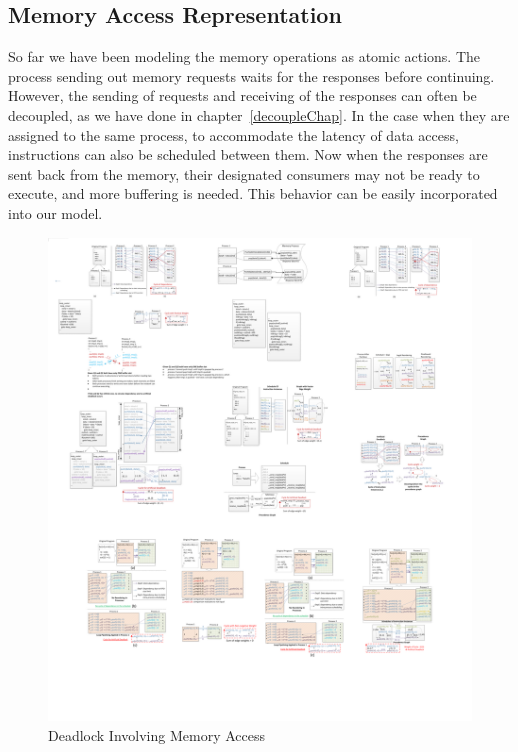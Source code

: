 \subsection{Memory Access Representation}
\label{memstrange}
So far we have been modeling the memory operations as atomic actions.
The process sending out memory requests
waits for the responses before continuing. 
However, the sending of requests and receiving of the responses can often
be decoupled, as we have done in chapter~\ref{decoupleChap}. In the case when they are assigned to the same process, to accommodate the latency of data access, instructions can also be scheduled between them. 
Now when the responses are sent back from the memory, their designated consumers
may not be ready to execute, and more buffering is needed. This behavior can be easily incorporated into our model. 
\begin{figure}[htp]
\begin{center}
\includegraphics[width=0.9\linewidth]{chap4fig/outstandingSchedule.pdf}
\caption{Deadlock Involving Memory Access
\label{fig:ff}}
\end{center}
\end{figure}

